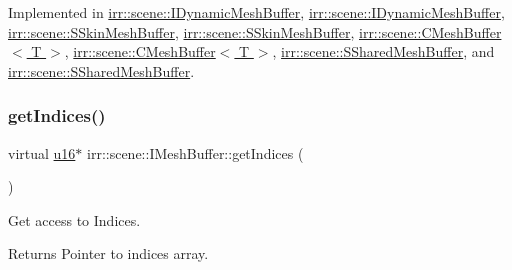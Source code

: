 Implemented in \hyperlink{classirr_1_1scene_1_1IDynamicMeshBuffer_a556d8107ac44cbb16892f54370e32812}{irr\+::scene\+::\+I\+Dynamic\+Mesh\+Buffer}, \hyperlink{classirr_1_1scene_1_1IDynamicMeshBuffer_a556d8107ac44cbb16892f54370e32812}{irr\+::scene\+::\+I\+Dynamic\+Mesh\+Buffer}, \hyperlink{structirr_1_1scene_1_1SSkinMeshBuffer_ada6af60ed1545fd0b3372ddbb71ada5e}{irr\+::scene\+::\+S\+Skin\+Mesh\+Buffer}, \hyperlink{structirr_1_1scene_1_1SSkinMeshBuffer_ada6af60ed1545fd0b3372ddbb71ada5e}{irr\+::scene\+::\+S\+Skin\+Mesh\+Buffer}, \hyperlink{classirr_1_1scene_1_1CMeshBuffer_a34a85f4868776d4cf312cdece5326c89}{irr\+::scene\+::\+C\+Mesh\+Buffer$<$ T $>$}, \hyperlink{classirr_1_1scene_1_1CMeshBuffer_a34a85f4868776d4cf312cdece5326c89}{irr\+::scene\+::\+C\+Mesh\+Buffer$<$ T $>$}, \hyperlink{structirr_1_1scene_1_1SSharedMeshBuffer_a16f7c525acba8d913b8de49dee869465}{irr\+::scene\+::\+S\+Shared\+Mesh\+Buffer}, and \hyperlink{structirr_1_1scene_1_1SSharedMeshBuffer_a16f7c525acba8d913b8de49dee869465}{irr\+::scene\+::\+S\+Shared\+Mesh\+Buffer}.

\mbox{\label{classirr_1_1scene_1_1IMeshBuffer_a3d33a561023314677361e30cf07ae429}} 
\subsubsection{\texorpdfstring{get\+Indices()}{getIndices()}\hspace{0.1cm}{\footnotesize\ttfamily [4/4]}}
{\footnotesize\ttfamily virtual \hyperlink{namespaceirr_ae9f8ec82692ad3b83c21f555bfa70bcc}{u16}$\ast$ irr\+::scene\+::\+I\+Mesh\+Buffer\+::get\+Indices (\begin{DoxyParamCaption}{ }\end{DoxyParamCaption})\hspace{0.3cm}{\ttfamily [pure virtual]}}



Get access to Indices. 

\begin{DoxyReturn}{Returns}
Pointer to indices array. 
\end{DoxyReturn}


